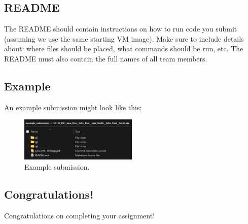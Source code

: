 \documentclass{article}
\begin{document}
\subsection*{README}
The README should contain instructions on how to run code you submit (assuming we use the same starting VM image).
Make sure to include details about: where files should be placed, what commands should be run, etc.
The README must also contain the full names of all team members.

\subsection*{Example}
An example submission might look like this:

\begin{figure}[H]
    \centering
    \includegraphics[width=0.5\textwidth]{img/example_submission2.png}
    \caption{Example submission.}
    \label{fig:example_submission}
\end{figure}


\subsection*{Congratulations!}
Congratulations on completing your assignment!
\end{document}
